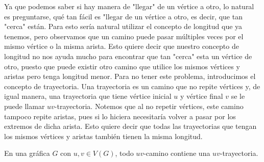     Ya que podemos saber si hay manera de "llegar" de un v\'ertice a otro, lo
    natural es preguntarse, qu\'e tan f\'acil es "llegar de un v\'ertice a otro,
    es decir, que tan "cerca" est\'an. Para esto ser\'ia natural utilizar el
    concepto de longitud que ya tenemos, pero observamos que un camino puede pasar
    m\'ultiples veces por el mismo v\'ertice o la misma arista. Esto quiere
    decir que nuestro concepto de longitud no nos ayuda mucho para encontrar que
    tan "cerca" esta un v\'ertice de otro, puesto que puede existir otro camino
    que utilice los mismos v\'ertices y aristas pero tenga longitud menor. Para
    no tener este problema, introducimos el concepto de trayectoria. Una
    trayectoria es un camino que no repite v\'ertices y, de igual manera, una
    trayectoria que tiene v\'ertice inicial $u$ y v\'ertice final $v$ se le
    puede llamar $uv$-trayectoria. Notemos que al no repetir v\'ertices, este
    camino tampoco repite aristas, pues si lo hiciera necesitar\'ia volver a
    pasar por los extremos de dicha arista. Esto quiere decir que todas las
    trayectorias que tengan los mismos v\'ertices y aristas tambi\'en tienen la
    misma longitud. 

    \begin{proposicion}
        En una gr\'afica $G$ con $u, v \in V(G)$, todo $uv$-camino contiene una
        $uv$-trayectoria.
    \end{proposicion}
    
